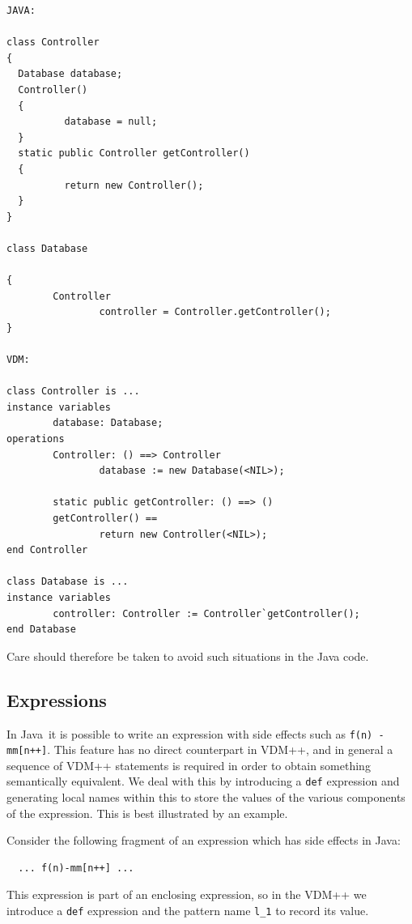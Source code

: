 \documentclass[\pformat,12pt]{article}
\newcommand{\JAVA}{Java}
\begin{document}
\begin{small}
\begin{verbatim}
JAVA:

class Controller
{
  Database database;
  Controller()
  {
          database = null;
  }
  static public Controller getController()
  {
          return new Controller();
  }
}

class Database

{
        Controller
                controller = Controller.getController();
}

VDM:

class Controller is ...
instance variables
        database: Database;
operations
        Controller: () ==> Controller
                database := new Database(<NIL>);

        static public getController: () ==> ()
        getController() ==
                return new Controller(<NIL>);
end Controller

class Database is ...
instance variables
        controller: Controller := Controller`getController();
end Database
\end{verbatim}
\end{small}

Care should therefore be taken to avoid such situations in the Java
code. 

\subsection{Expressions}\label{expressions}

In \JAVA\ it is possible to write an expression with side effects such
as \texttt{f(n) - mm[n++]}. This feature has no direct counterpart
in VDM++, and in general a sequence of VDM++ statements is required in
order to obtain something semantically equivalent. We deal with this
by introducing a \texttt{def} expression and generating local names
within this to store the values of the various components of the
expression. This is best illustrated by an example.

Consider the following fragment of an expression which has side
effects in Java:

\begin{small}
\begin{verbatim}
  ... f(n)-mm[n++] ...
\end{verbatim}
\end{small}

This expression is part of an enclosing expression, so in the VDM++ we
introduce a \texttt{def} expression and the pattern name \texttt{l\_1}
to record its value. 
\end{document}
